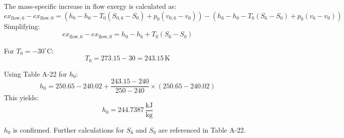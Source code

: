 The mass-specific increase in flow exergy is calculated as:  
\[
ex_{\text{flow},6} - ex_{\text{flow},0} = (h_0 - h_0 - T_0(S_{0,6} - S_0) + p_0(v_{0,6} - v_0)) - (h_6 - h_0 - T_0(S_{6} - S_0) + p_0(v_6 - v_0))
\]  
Simplifying:  
\[
ex_{\text{flow},6} - ex_{\text{flow},0} = h_0 - h_6 + T_0(S_6 - S_0)
\]  

For \( T_0 = -30^\circ\text{C} \):  
\[
T_0 = 273.15 - 30 = 243.15 \, \text{K}
\]  

Using Table A-22 for \( h_0 \):  
\[
h_0 = 250.65 - 240.02 + \frac{243.15 - 240}{250 - 240} \times (250.65 - 240.02)
\]  
This yields:  
\[
h_0 = 244.7387 \, \frac{\text{kJ}}{\text{kg}}
\]  

\( h_0 \) is confirmed. Further calculations for \( S_6 \) and \( S_0 \) are referenced in Table A-22.